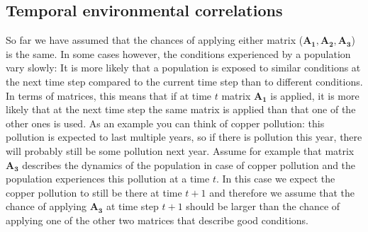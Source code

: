 \documentclass{article}\usepackage[]{graphicx}\usepackage[]{color}
\begin{document}
\subsection{Temporal environmental correlations}
So far we have assumed that the chances of applying either matrix ($\boldsymbol{A_1,A_2,A_3}$) is the same. In some cases however, the conditions experienced by a population vary slowly: It is more likely that a population is exposed to similar conditions at the next time step compared to the current time step than to different conditions. In terms of matrices, this means that if at time $t$ matrix $\boldsymbol{A_1}$ is applied, it is more likely that at the next time step the same matrix is applied than that one of the other ones is used. As an example you can think of copper pollution: this pollution is expected to last multiple years, so if there is pollution this year, there will probably still be some pollution next year. Assume for example that matrix $\boldsymbol{A_3}$ describes the dynamics of the population in case of copper pollution and the population experiences this pollution at a time $t$. In this case we expect the copper pollution to still be there at time $t+1$ and therefore we assume that the chance of applying $\boldsymbol{A_3}$ at time step $t+1$ should be larger than the chance of applying one of the other two matrices that describe good conditions.
\end{document}
